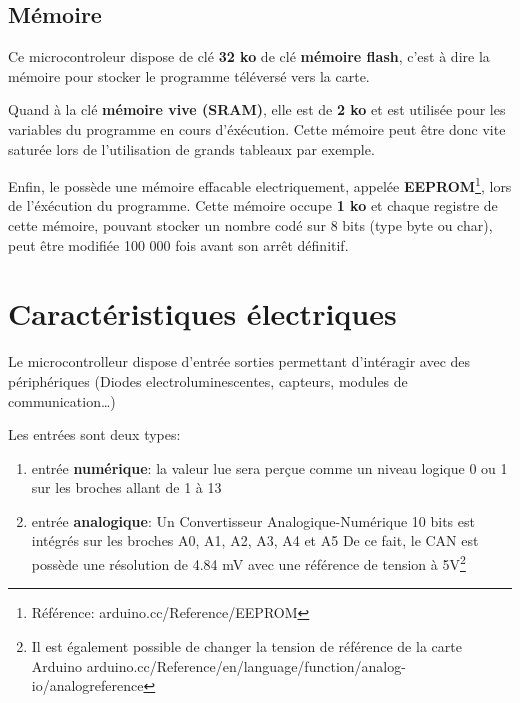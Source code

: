 \subsection{Mémoire}

Ce microcontroleur dispose de clé \textbf{32 ko} de clé \textbf{mémoire flash}, c'est à dire la mémoire pour stocker le programme téléversé vers la carte. \newline


Quand à la clé \textbf{mémoire vive (SRAM)}, elle est de \textbf{2 ko} et est utilisée pour les variables du programme en cours d'éxécution. \newline
Cette mémoire peut être donc vite saturée lors de l'utilisation de grands tableaux par exemple. \newline


Enfin, le  possède une mémoire effacable electriquement, appelée \textbf{EEPROM}\footnote{Référence: arduino.cc/Reference/EEPROM}, lors de l'éxécution du programme. \newline
Cette mémoire occupe \textbf{1 ko} et chaque registre de cette mémoire, pouvant stocker un nombre codé sur 8 bits (type byte ou char), peut être modifiée 100 000 fois avant son arrêt définitif.\newline


\section{Caractéristiques électriques}

Le microcontrolleur dispose d'entrée sorties permettant d'intéragir avec des périphériques (Diodes electroluminescentes, capteurs, modules de communication\ldots)

Les entrées sont deux types: 

\begin{enumerate}
\item entrée \textbf{numérique}: la valeur lue sera perçue comme un niveau logique 0 ou 1 sur les broches allant de 1 à 13
\item entrée \textbf{analogique}: Un Convertisseur Analogique-Numérique 10 bits est intégrés sur les broches A0, A1, A2, A3, A4 et A5
De ce fait, le CAN est possède une résolution de 4.84 mV avec une référence de tension à 5V\footnote{Il est également possible de changer la tension de référence de la carte Arduino 
arduino.cc/Reference/en/language/function/analog-io/analogreference}
\end{enumerate}

